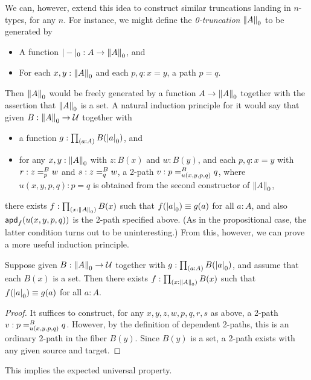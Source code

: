 We can, however, extend this idea to construct similar truncations landing in $n$-types, for any $n$.
For instance, we might define the \emph{0-truncation} $\trunc0A$ to be generated by
\begin{itemize}
\item A function $\tprojf0 : A \to \trunc0 A$, and
\item For each $x,y:\trunc0A$ and each $p,q:x=y$, a path $p=q$.
\end{itemize}
Then $\trunc0A$ would be freely generated by a function $A\to \trunc0A$ together with the assertion that $\trunc0A$ is a set.
A natural induction principle for it would say that given $B:\trunc0 A \to \type$ together with
\begin{itemize}
\item a function $g:\prd{a:A} B(\tproj0a)$, and
\item for any $x,y:\trunc0A$ with $z:B(x)$ and $w:B(y)$, and each $p,q:x=y$ with $r:\dpath{B}{p}{z}{w}$ and $s:\dpath{B}{q}{z}{w}$, a 2-path $v:\dpath{B}{u(x,y,p,q)}{p}{q}$, where $u(x,y,p,q):p=q$ is obtained from the second constructor of $\trunc0A$,
\end{itemize}
there exists $f:\prd{x:\trunc0A} B(x)$ such that $f(\tproj0a)\jdeq g(a)$ for all $a:A$, and also $\apd{f}{u(x,y,p,q)}$ is the 2-path specified above.
(As in the propositional case, the latter condition turns out to be uninteresting.)
From this, however, we can prove a more useful induction principle.

\begin{lem}\label{thm:trunc0-ind}
  Suppose given $B:\trunc0 A \to \type$ together with $g:\prd{a:A} B(\tproj0a)$, and assume that each $B(x)$ is a set.
  Then there exists $f:\prd{x:\trunc0A} B(x)$ such that $f(\tproj0a)\jdeq g(a)$ for all $a:A$.
\end{lem}
\begin{proof}
  It suffices to construct, for any $x,y,z,w,p,q,r,s$ as above, a 2-path $v:\dpath{B}{u(x,y,p,q)}{p}{q}$.
  However, by the definition of dependent 2-paths, this is an ordinary 2-path in the fiber $B(y)$.
  Since $B(y)$ is a set, a 2-path exists with any given source and target.
\end{proof}

This implies the expected universal property.

